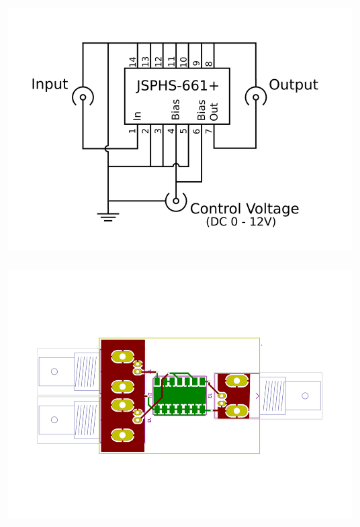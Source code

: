 \begin{figure}
	\centering
	\begin{subfigure}{.5\textwidth}
		\centering
		\includegraphics[height=0.2\textheight]{Chapters/Deflection/circuit_phase}
		\caption{}
		\label{fig:circuit_phase}
	\end{subfigure}%
	\begin{subfigure}{.5\textwidth}
		\centering
		\includegraphics[height=0.2\textheight]{Chapters/Deflection/PCB_phase}
		\caption{}
		\label{fig:PCB_phase}
	\end{subfigure}
	\caption{}
	\label{fig:PhaseShifter}
\end{figure}

